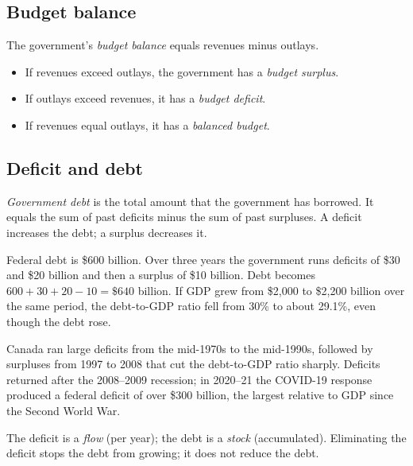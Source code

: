 \subsection{Budget balance}

\begin{definition}
The government's \emph{budget balance} equals revenues minus outlays.
\begin{itemize}
  \item If revenues exceed outlays, the government has a \emph{budget surplus}.
  \item If outlays exceed revenues, it has a \emph{budget deficit}.
  \item If revenues equal outlays, it has a \emph{balanced budget}.
\end{itemize}
\end{definition}

\subsection{Deficit and debt}

\begin{definition}
\emph{Government debt} is the total amount that the government has borrowed. It equals the
sum of past deficits minus the sum of past surpluses. A deficit increases the debt; a
surplus decreases it.
\end{definition}

\begin{example}
Federal debt is \$600 billion. Over three years the government runs deficits of \$30 and
\$20 billion and then a surplus of \$10 billion. Debt becomes
$600 + 30 + 20 - 10 = \$640$ billion. If GDP grew from \$2{,}000 to \$2{,}200 billion
over the same period, the debt-to-GDP ratio fell from 30\% to about 29.1\%, even though
the debt rose.
\end{example}

\begin{remark}
Canada ran large deficits from the mid-1970s to the mid-1990s, followed by surpluses from
1997 to 2008 that cut the debt-to-GDP ratio sharply. Deficits returned after the 2008--2009
recession; in 2020--21 the COVID-19 response produced a federal deficit of over \$300
billion, the largest relative to GDP since the Second World War.
\end{remark}

\begin{important}
The deficit is a \emph{flow} (per year); the debt is a \emph{stock} (accumulated).
Eliminating the deficit stops the debt from growing; it does not reduce the debt.
\end{important}

